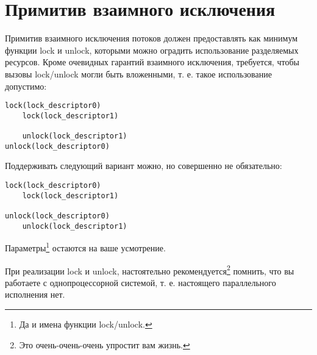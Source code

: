 \section{Примитив взаимного исключения}

Примитив взаимного исключения потоков должен предоставлять как минимум функции
lock и unlock, которыми можно оградить использование разделяемых ресурсов. Кроме
очевидных гарантий взаимного исключения, требуется, чтобы вызовы lock/unlock
могли быть вложенными, т. е. такое использование допустимо:

\begin{verbatim}
lock(lock_descriptor0)
    lock(lock_descriptor1)

    unlock(lock_descriptor1)
unlock(lock_descriptor0)
\end{verbatim}

Поддерживать следующий вариант можно, но совершенно не обязательно:

\begin{verbatim}
lock(lock_descriptor0)
    lock(lock_descriptor1)

unlock(lock_descriptor0)
    unlock(lock_descriptor1)
\end{verbatim}

Параметры\footnote{Да и имена функции lock/unlock.} остаются на ваше усмотрение.

При реализации lock и unlock, настоятельно рекомендуется\footnote{Это
очень-очень-очень упростит вам жизнь.} помнить, что вы работаете с
однопроцессорной системой, т. е. настоящего параллельного исполнения нет.
